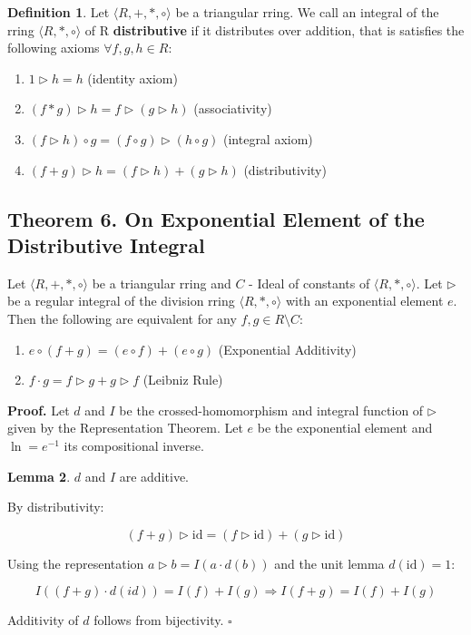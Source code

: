 \documentclass[12pt]{article}
\theoremstyle{definition}
\newtheorem{definition}{Definition}[section]
\newtheorem{lemma}[definition]{Lemma}
\begin{document}
\begin{definition} Let $\langle R, +, *, \circ \rangle$ be a triangular rring. We call an integral of the rring $\langle R, *, \circ \rangle$ of R \textbf{distributive} if it distributes over addition, that is satisfies the following axioms $\forall f, g, h \in R$:
\begin{enumerate}
\item $1 \triangleright h = h$ \hfill (identity axiom)  
\item $(f * g) \triangleright h = f \triangleright (g \triangleright h)$ \hfill (associativity)  
\item $(f \triangleright h) \circ g = (f \circ g) \triangleright (h \circ g)$ \hfill (integral axiom)  
\item $(f + g) \triangleright h = (f \triangleright h) + (g \triangleright h)$ \hfill (distributivity)
\end{enumerate}
\end{definition}

\subsection{Theorem 6. On Exponential Element of the Distributive Integral}

Let $\langle R, +, *, \circ \rangle$ be a triangular rring and $C$ - Ideal of constants of $\langle R, *, \circ \rangle$. Let $\triangleright$ be a regular integral of the division rring $\langle R, *, \circ \rangle$ with an exponential element $e$. Then the following are equivalent for any $f, g \in R \setminus C$:

\begin{enumerate}
\item  $e \circ (f + g) = (e \circ f) + (e \circ g)$ \hfill (Exponential Additivity)
\item  $f \cdot g = f \triangleright g + g \triangleright f$ \hfill (Leibniz Rule)
\end{enumerate}


\vspace{10pt}
\noindent\textbf{Proof.}  Let $d$ and $I$ be the crossed-homomorphism and integral function of $\triangleright$ given by the Representation Theorem. Let $e$ be the exponential element and $\ln = e^{-1}$ its compositional inverse.

\begin{lemma} $d$ and $I$ are additive.  

\vspace{5pt}
\noindent By distributivity:

\[
(f + g) \triangleright \mathrm{id} = (f \triangleright \mathrm{id}) + (g \triangleright \mathrm{id})
\]

\vspace{5pt}
\noindent Using the representation $a \triangleright b = I(a \cdot d(b))$ and the unit lemma $d(\mathrm{id}) = 1$:

\[
I((f + g) \cdot d(id)) = I(f) + I(g) \Rightarrow I(f + g) = I(f) + I(g)
\]

\vspace{5pt}
Additivity of $d$ follows from bijectivity. $\square$
\end{lemma}
\end{document}

